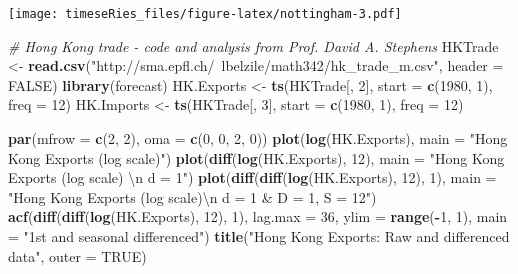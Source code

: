 \documentclass[]{book}
\newenvironment{Shaded}{\begin{snugshade}}{\end{snugshade}}
\newcommand{\KeywordTok}[1]{\textcolor[rgb]{0.13,0.29,0.53}{\textbf{#1}}}
\newcommand{\DataTypeTok}[1]{\textcolor[rgb]{0.13,0.29,0.53}{#1}}
\newcommand{\DecValTok}[1]{\textcolor[rgb]{0.00,0.00,0.81}{#1}}
\newcommand{\CharTok}[1]{\textcolor[rgb]{0.31,0.60,0.02}{#1}}
\newcommand{\StringTok}[1]{\textcolor[rgb]{0.31,0.60,0.02}{#1}}
\newcommand{\CommentTok}[1]{\textcolor[rgb]{0.56,0.35,0.01}{\textit{#1}}}
\newcommand{\OtherTok}[1]{\textcolor[rgb]{0.56,0.35,0.01}{#1}}
\newcommand{\OperatorTok}[1]{\textcolor[rgb]{0.81,0.36,0.00}{\textbf{#1}}}
\newcommand{\NormalTok}[1]{#1}
\begin{document}
\texttt{[image: timeseRies\_files/figure-latex/nottingham-3.pdf]}

\begin{Shaded}
\begin{Highlighting}[]
\CommentTok{# Hong Kong trade - code and analysis from Prof. David A. Stephens}
\NormalTok{HKTrade <-}\StringTok{ }\KeywordTok{read.csv}\NormalTok{(}\StringTok{"http://sma.epfl.ch/~lbelzile/math342/hk_trade_m.csv"}\NormalTok{, }\DataTypeTok{header =} \OtherTok{FALSE}\NormalTok{)}
\KeywordTok{library}\NormalTok{(forecast)}
\NormalTok{HK.Exports <-}\StringTok{ }\KeywordTok{ts}\NormalTok{(HKTrade[, }\DecValTok{2}\NormalTok{], }\DataTypeTok{start =} \KeywordTok{c}\NormalTok{(}\DecValTok{1980}\NormalTok{, }\DecValTok{1}\NormalTok{), }\DataTypeTok{freq =} \DecValTok{12}\NormalTok{)}
\NormalTok{HK.Imports <-}\StringTok{ }\KeywordTok{ts}\NormalTok{(HKTrade[, }\DecValTok{3}\NormalTok{], }\DataTypeTok{start =} \KeywordTok{c}\NormalTok{(}\DecValTok{1980}\NormalTok{, }\DecValTok{1}\NormalTok{), }\DataTypeTok{freq =} \DecValTok{12}\NormalTok{)}

\KeywordTok{par}\NormalTok{(}\DataTypeTok{mfrow =} \KeywordTok{c}\NormalTok{(}\DecValTok{2}\NormalTok{, }\DecValTok{2}\NormalTok{), }\DataTypeTok{oma =} \KeywordTok{c}\NormalTok{(}\DecValTok{0}\NormalTok{, }\DecValTok{0}\NormalTok{, }\DecValTok{2}\NormalTok{, }\DecValTok{0}\NormalTok{))}
\KeywordTok{plot}\NormalTok{(}\KeywordTok{log}\NormalTok{(HK.Exports), }\DataTypeTok{main =} \StringTok{"Hong Kong Exports (log scale)"}\NormalTok{)}
\KeywordTok{plot}\NormalTok{(}\KeywordTok{diff}\NormalTok{(}\KeywordTok{log}\NormalTok{(HK.Exports), }\DecValTok{12}\NormalTok{), }\DataTypeTok{main =} \StringTok{"Hong Kong Exports (log scale) }\CharTok{\textbackslash{}n}\StringTok{ d = 1"}\NormalTok{)}
\KeywordTok{plot}\NormalTok{(}\KeywordTok{diff}\NormalTok{(}\KeywordTok{diff}\NormalTok{(}\KeywordTok{log}\NormalTok{(HK.Exports), }\DecValTok{12}\NormalTok{), }\DecValTok{1}\NormalTok{), }\DataTypeTok{main =} \StringTok{"Hong Kong Exports (log scale)}\CharTok{\textbackslash{}n}\StringTok{ d = 1 & D = 1, S = 12"}\NormalTok{)}
\KeywordTok{acf}\NormalTok{(}\KeywordTok{diff}\NormalTok{(}\KeywordTok{diff}\NormalTok{(}\KeywordTok{log}\NormalTok{(HK.Exports), }\DecValTok{12}\NormalTok{), }\DecValTok{1}\NormalTok{), }\DataTypeTok{lag.max =} \DecValTok{36}\NormalTok{, }\DataTypeTok{ylim =} \KeywordTok{range}\NormalTok{(}\OperatorTok{-}\DecValTok{1}\NormalTok{, }\DecValTok{1}\NormalTok{), }\DataTypeTok{main =} \StringTok{"1st and seasonal differenced"}\NormalTok{)}
\KeywordTok{title}\NormalTok{(}\StringTok{"Hong Kong Exports: Raw and differenced data"}\NormalTok{, }\DataTypeTok{outer =} \OtherTok{TRUE}\NormalTok{)}
\end{Highlighting}
\end{Shaded}
\end{document}
